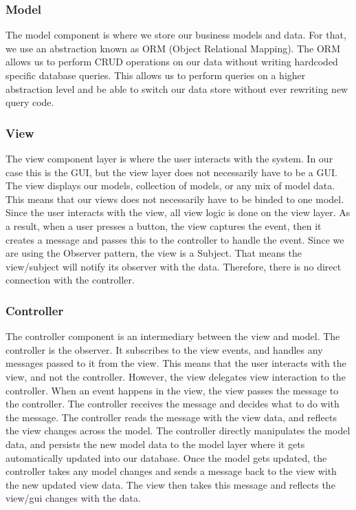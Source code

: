 \documentclass[12pt]{article}
\begin{document}
\subsubsection{Model}
The model component is where we store our business models and data. For that, we use an abstraction known as ORM (Object Relational Mapping). The ORM allows us to perform CRUD operations on our data without writing hardcoded specific database queries. This allows us to perform queries on a higher abstraction level and be able to switch our data store without ever rewriting new query code. 


\subsubsection{View}
The view component layer is where the user interacts with the system. In our case this is the GUI, but the view layer does not necessarily have to be a GUI. The view displays our models, collection of models, or any mix of model data. This means that our views does not necessarily have to be binded to one model. Since the user interacts with the view, all view logic is done on the view layer. As a result, when a user presses a button, the view captures the event, then it creates a message and passes this to the controller to handle the event. Since we are using the Observer pattern, the view is a Subject. That means the view/subject will notify its observer with the data. Therefore, there is no direct connection with the controller. 


\subsubsection{Controller}
The controller component is an intermediary between the view and model. The controller is the observer. It subscribes to the view events, and handles any messages passed to it from the view.  This means that the user interacts with the view, and not the controller. However, the view delegates view interaction to the controller. When an event happens in the view, the view passes the message to the controller. The controller receives the message and decides what to do with the message. The controller reads the message with the view data, and reflects the view changes across the model. The controller directly manipulates the model data, and persists the new model data to the model layer where it gets automatically updated into our database. Once the model gets updated, the controller takes any model changes and sends a message back to the view with the new updated view data. The view then takes this message and reflects the view/gui changes with the data.
\end{document}
